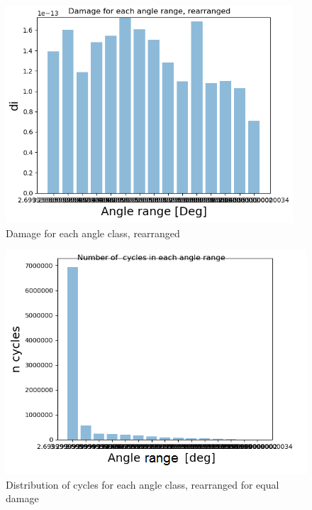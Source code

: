 \begin{figure}[H]
\centering
\includegraphics[scale=0.9]{figures/newdam}
\caption[Damage for each angle class, rearranged]{Damage for each angle class, rearranged}
 \label{fig:newdam}
\end{figure}

\begin{figure}[H]
\centering
\includegraphics[scale=1]{figures/newcyc}
\caption[Distribution of cycles for each angle class, rearranged for equal damage]{Distribution of cycles for each angle class, rearranged for equal damage}
 \label{fig:newcyc}
\end{figure}

